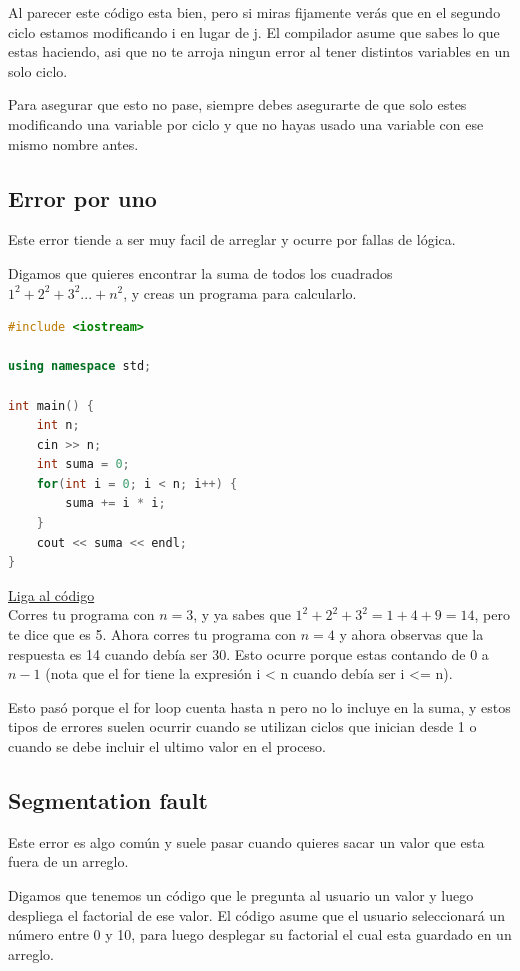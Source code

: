 \documentclass{article}
\begin{document}
Al parecer este código esta bien, pero si miras fijamente verás que en el segundo ciclo estamos modificando i en lugar de j. El compilador asume que sabes lo que estas haciendo, asi que no te arroja ningun error al tener distintos variables en un solo ciclo.

Para asegurar que esto no pase, siempre debes asegurarte de que solo estes modificando una variable por ciclo y que no hayas usado una variable con ese mismo nombre antes.

\subsection{Error por uno}
Este error tiende a ser muy facil de arreglar y ocurre por fallas de lógica.

Digamos que quieres encontrar la suma de todos los cuadrados $1^2 + 2^2 + 3^2 ... + n^2$, y creas un programa para calcularlo.

\begin{lstlisting}[language=C++, title=Error por uno]
#include <iostream>

using namespace std;

int main() {
	int n;
	cin >> n;
	int suma = 0;
	for(int i = 0; i < n; i++) {
		suma += i * i;
	}
	cout << suma << endl;
}
\end{lstlisting}
\href{https://repl.it/@Jamesscn/Sumás-Cuadrados}{Liga al código}\\

Corres tu programa con $n = 3$, y ya sabes que $1^2 + 2^2 + 3^2 = 1 + 4 + 9 = 14$, pero te dice que es 5. Ahora corres tu programa con $n = 4$ y ahora observas que la respuesta es 14 cuando debía ser 30. Esto ocurre porque estas contando de $0$ a $n-1$ (nota que el for tiene la expresión i < n cuando debía ser i <= n).

Esto pasó porque el for loop cuenta hasta n pero no lo incluye en la suma, y estos tipos de errores suelen ocurrir cuando se utilizan ciclos que inician desde 1 o cuando se debe incluir el ultimo valor en el proceso.

\subsection{Segmentation fault}
Este error es algo común y suele pasar cuando quieres sacar un valor que esta fuera de un arreglo.

Digamos que tenemos un código que le pregunta al usuario un valor y luego despliega el factorial de ese valor. El código asume que el usuario seleccionará un número entre 0 y 10, para luego desplegar su factorial el cual esta guardado en un arreglo.
\end{document}
